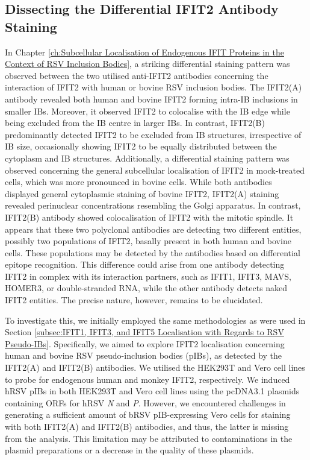 \subsection{Dissecting the Differential IFIT2 Antibody Staining} \label{subsec:Dissecting the Differential IFIT2 Antibody Staining}
In Chapter \ref{ch:Subcellular Localisation of Endogenous IFIT Proteins in the Context of RSV Inclusion Bodies}, a striking differential staining pattern was observed between the two utilised anti-IFIT2 antibodies concerning the interaction of IFIT2 with human or bovine RSV inclusion bodies. The IFIT2(A) antibody revealed both human and bovine IFIT2 forming intra-IB inclusions in smaller IBs. Moreover, it observed IFIT2 to colocalise with the IB edge while being excluded from the IB centre in larger IBs. In contrast, IFIT2(B) predominantly detected IFIT2 to be excluded from IB structures, irrespective of IB size, occasionally showing IFIT2 to be equally distributed between the cytoplasm and IB structures. Additionally, a differential staining pattern was observed concerning the general subcellular localisation of IFIT2 in mock-treated cells, which was more pronounced in bovine cells. While both antibodies displayed general cytoplasmic staining of bovine IFIT2, IFIT2(A) staining revealed perinuclear concentrations resembling the Golgi apparatus. In contrast, IFIT2(B) antibody showed colocalisation of IFIT2 with the mitotic spindle. It appears that these two polyclonal antibodies are detecting two different entities, possibly two populations of IFIT2, basally present in both human and bovine cells. These populations may be detected by the antibodies based on differential epitope recognition. This difference could arise from one antibody detecting IFIT2 in complex with its interaction partners, such as IFIT1, IFIT3, MAVS, HOMER3, or double-stranded RNA, while the other antibody detects naked IFIT2 entities. The precise nature, however, remains to be elucidated.

To investigate this, we initially employed the same methodologies as were used in Section \ref{subsec:IFIT1, IFIT3, and IFIT5 Localisation with Regards to RSV Pseudo-IBs}. Specifically, we aimed to explore IFIT2 localisation concerning human and bovine RSV pseudo-inclusion bodies (pIBs), as detected by the IFIT2(A) and IFIT2(B) antibodies. We utilised the HEK293T and Vero cell lines to probe for endogenous human and monkey IFIT2, respectively. We induced hRSV pIBs in both HEK293T and Vero cell lines using the pcDNA3.1 plasmids containing ORFs for hRSV \textit{N} and \textit{P}. However, we encountered challenges in generating a sufficient amount of bRSV pIB-expressing Vero cells for staining with both IFIT2(A) and IFIT2(B) antibodies, and thus, the latter is missing from the analysis. This limitation may be attributed to contaminations in the plasmid preparations or a decrease in the quality of these plasmids.

